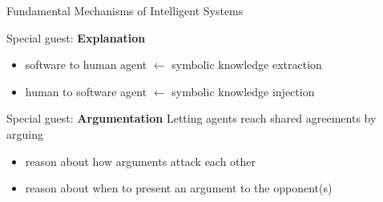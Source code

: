 \documentclass[presentation]{beamer}\mode<presentation>{\usetheme{AMSBolognaFC}}
\begin{document}
\begin{frame}[c,allowframebreaks]{Fundamental Mechanisms of Intelligent Systems}
\begin{block}{Special guest: \textbf{Explanation}}
\begin{itemize}
        \item software to human agent $\leftarrow$ symbolic knowledge \alert{extraction}
        \item human to software agent $\leftarrow$ symbolic knowledge \alert{injection}
    \end{itemize}
\end{block}
%
\begin{block}{Special guest: \textbf{Argumentation}}
    Letting agents reach shared agreements by \alert{arguing}
    \begin{itemize}
        \item reason about how arguments attack each other
        \item reason about when to present an argument to the opponent(s)
    \end{itemize}
\end{block}
%
\end{frame}
\end{document}
